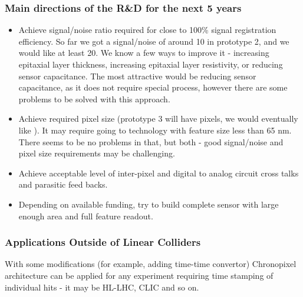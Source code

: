 \subsubsection{Main directions of the R\&D for the next 5 years}
\begin{itemize}
    \item Achieve signal/noise ratio required for close to 100\% signal registration efficiency. So far we got a signal/noise of around 10 in prototype 2, and we would like at least 20. We know a few ways to improve it - increasing epitaxial layer thickness, increasing epitaxial layer resistivity, or reducing sensor capacitance. The most attractive would be reducing sensor capacitance, as it does not require special process, however there are some problems to be solved with this approach.
    \item Achieve required pixel size (prototype 3 will have \unit[25]{\micron} pixels, we would eventually like \unit[15]{\micron}). It may require going to technology with feature size less than 65 nm. There seems to be no problems in that, but both - good signal/noise and pixel size requirements may be challenging.
    \item Achieve acceptable level of inter-pixel and digital to analog circuit cross talks and parasitic feed backs.
    \item Depending on available funding, try to build complete sensor with large enough area and full feature readout.
\end{itemize}
\subsubsection{Applications Outside of Linear Colliders}
     With some modifications (for example, adding time-time convertor) Chronopixel architecture can be applied for any experiment requiring time stamping of individual hits - it may be HL-LHC, CLIC and so on.

